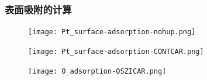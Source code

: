 
\frame
{
	\frametitle{表面吸附的计算}
	{\fontsize{7.2pt}{5.2pt}\selectfont{结构弛豫后的基态能量}}
\begin{figure}[h!]
\centering
\vskip -5pt
\texttt{[image: Pt\_surface-adsorption-nohup.png]}
\caption{\fontsize{6.2pt}{5.2pt}}%
\label{Pt_surface-adsorption-nohup}
\end{figure}
{\fontsize{7.2pt}{5.2pt}}%
\begin{figure}[h!]
\centering
\vskip -5pt
\texttt{[image: Pt\_surface-adsorption-CONTCAR.png]}
\caption{\fontsize{6.2pt}{5.2pt}}%
\label{Pt_surface-adsorption-CONTCAR}
\end{figure}
{\fontsize{7.2pt}{5.2pt}}%
\begin{figure}[h!]
\centering
\vskip -5pt
\texttt{[image: O\_adsorption-OSZICAR.png]}
\caption{\fontsize{6.2pt}{5.2pt}}%
\label{O_adsorption-OSZICAR}
\end{figure}
}

